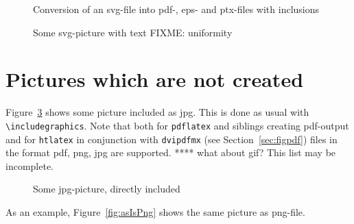 \documentclass[12pt]{book}
\newcommand{\gls}[1]{#1}
\begin{document}
\begin{figure}[htb]
\begin{center}
\end{center}
\caption{\label{fig:svg2pdf}Conversion of an svg-file 
into pdf-, eps- and ptx-files with inclusions}
\end{figure}


\begin{figure}[htb]
\begin{center}
\end{center}
\caption{\label{fig:svgWithText}Some svg-picture with text FIXME: uniformity  }
\end{figure}



\section{Pictures which are not created}\label{sec:picasis}

Figure~\ref{fig:asIsJpg} shows some picture included as jpg. 
This is done as usual with {\tt\textbackslash includegraphics}. 
Note that both for \texttt{pdflatex} and siblings creating pdf-output 
and for \texttt{htlatex} in conjunction with \texttt{dvipdfmx} 
(see Section~\ref{sec:figpdf}) 
files in the format pdf, \gls{png}, \gls{jpg} are supported. 
 **** what about \gls{gif}? 
This list may be incomplete. 

\begin{figure}[htb]
\begin{center}
\end{center}
\caption{\label{fig:asIsJpg}Some jpg-picture, directly included }
\end{figure}

As an example, Figure~\ref{fig:asIsPng} shows the same picture 
as png-file. 
\end{document}
